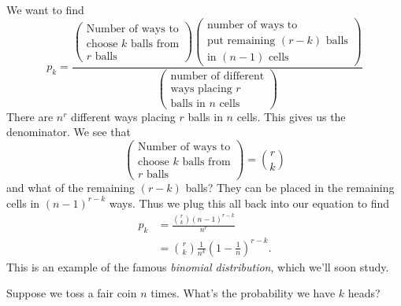 We want to find
\begin{equation}
p_{k} = \frac{\begin{pmatrix}
    \mbox{Number of ways to}\\
    \mbox{choose $k$ balls from}\\
    \mbox{$r$ balls}
  \end{pmatrix}
\begin{pmatrix}
  \mbox{number of ways to}\\
  \mbox{put remaining $(r-k)$ balls}\\
  \mbox{in $(n-1)$ cells}
\end{pmatrix}}{\begin{pmatrix}\mbox{number of different}\\
\mbox{ways placing $r$}\\
\mbox{balls in $n$ cells}
  \end{pmatrix}}
\end{equation}
There are $n^{r}$ different ways placing $r$ balls in $n$ cells. This
gives us the denominator. We see that
\begin{equation}
\begin{pmatrix}
    \mbox{Number of ways to}\\
    \mbox{choose $k$ balls from}\\
    \mbox{$r$ balls}
  \end{pmatrix} = \binom{r}{k}
\end{equation}
and what of the remaining $(r-k)$ balls? They can be placed in the
remaining cells in $(n-1)^{r-k}$ ways. Thus we plug this all back into
our equation to find
\begin{equation}
\begin{split}
p_{k}&=\frac{\displaystyle\binom{r}{k}(n-1)^{r-k}}{n^{r}}\\
&=\binom{r}{k}\frac{1}{n^{k}}\left(1-\frac{1}{n}\right)^{r-k}.
\end{split}
\end{equation}
This is an example of the famous \emph{binomial distribution}, which
we'll soon study.

\M
Suppose we toss a fair coin $n$ times. What's the probability we have
$k$ heads? 

